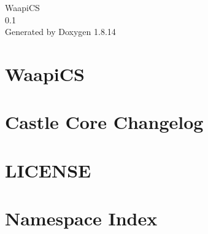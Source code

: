 \documentclass[twoside]{book}
\newcommand{\+}{\discretionary{\mbox{\scriptsize$\hookleftarrow$}}{}{}}
\newcommand{\clearemptydoublepage}{%
  \newpage{\pagestyle{empty}\cleardoublepage}%
}
\begin{document}
\hypersetup{pageanchor=false,
             bookmarksnumbered=true,
             pdfencoding=unicode
            }
\begin{titlepage}
\vspace*{7cm}
\begin{center}%
{\Large Waapi\+CS \\[1ex]\large 0.\+1 }\\
\vspace*{1cm}
{\large Generated by Doxygen 1.8.14}\\
\end{center}
\end{titlepage}
\clearemptydoublepage
{}
\tableofcontents
\clearemptydoublepage
{}
\hypersetup{pageanchor=true}

\chapter{Waapi\+CS}
\label{md__c_1__users_adamt__documents__git_hub__waapi_c_s__r_e_a_d_m_e}

\chapter{Castle Core Changelog}
\label{md__c_1__users_adamt__documents__git_hub__waapi_c_s__waapi_c_s_packages__castle_8_core_84_82_81__c_h_a_n_g_e_l_o_g}

\chapter{L\+I\+C\+E\+N\+SE}
\label{md__c_1__users_adamt__documents__git_hub__waapi_c_s__waapi_c_s_packages__newtonsoft_8_json_811_80_82__l_i_c_e_n_s_e}

\chapter{Namespace Index}

\end{document}
